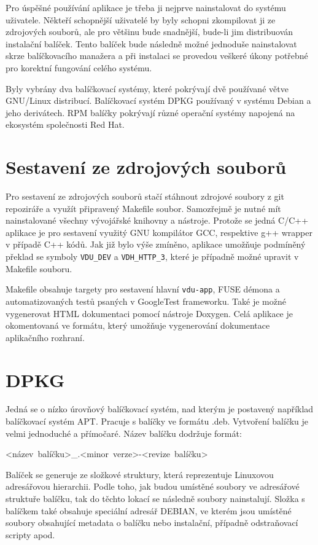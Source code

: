 Pro úspěšné používání aplikace je třeba ji nejprve nainstalovat do systému uživatele. Někteří schopnější uživatelé by byly schopni zkompilovat ji ze zdrojových
souborů, ale pro většinu bude snadnější, bude-li jim distribuován instalační balíček. Tento balíček bude následně možné jednoduše nainstalovat skrze balíčkovacího manažera
a při instalaci se provedou veškeré úkony potřebné pro korektní fungování celého systému.

Byly vybrány dva balíčkovací systémy, které pokrývají dvě používané větve \mbox{GNU/Linux} distribucí. Balíčkovací systém DPKG používaný v systému Debian a jeho derivátech.
RPM balíčky pokrývají různé operační systémy napojená na ekosystém společnosti Red Hat.

\section{Sestavení ze zdrojových souborů}

Pro sestavení ze zdrojových souborů stačí stáhnout zdrojové soubory z git repoziráře a využít připravený Makefile soubor. Samozřejmě je nutné mít nainstalované
všechny vývojářské knihovny a nástroje. Protože se jedná C/C++ aplikace je pro sestavení využitý GNU kompilátor GCC, respektive g++ wrapper v případě C++ kódů.
Jak již bylo výše zmíněno, aplikace umožňuje podmíněný překlad se symboly \texttt{VDU\_DEV} a \texttt{VDH\_HTTP\_3}, které je případně možné upravit v Makefile souboru.

Makefile obsahuje targety pro sestavení hlavní \texttt{vdu-app}, FUSE démona a automatizovaných testů psaných v GoogleTest frameworku. Také je možné vygenerovat HTML dokumentaci
pomocí nástroje Doxygen. Celá aplikace je okomentovaná ve formátu, který umožňuje vygenerování dokumentace aplikačního rozhraní.

\section{DPKG}

Jedná se o nízko úrovňový balíčkovací systém, nad kterým je postavený například balíčkovací systém APT. Pracuje s balíčky ve formátu .deb. Vytvoření balíčku
je velmi jednoduché a přímočaré. Název balíčku dodržuje formát: 
\begin{center}
    \mbox{<název balíčku>\_<major verze>.<minor verze>-<revize balíčku>}
\end{center}
Balíček se generuje ze složkové struktury, která reprezentuje Linuxovou adresářovou hierarchii. Podle toho, jak budou umístěné soubory ve adresářové struktuře balíčku,
tak do těchto lokací se následně soubory nainstalují. Složka s balíčkem také obsahuje speciální adresář DEBIAN, ve kterém jsou umístěné soubory obsahující metadata o 
balíčku nebo instalační, případně odstraňovací scripty apod.

